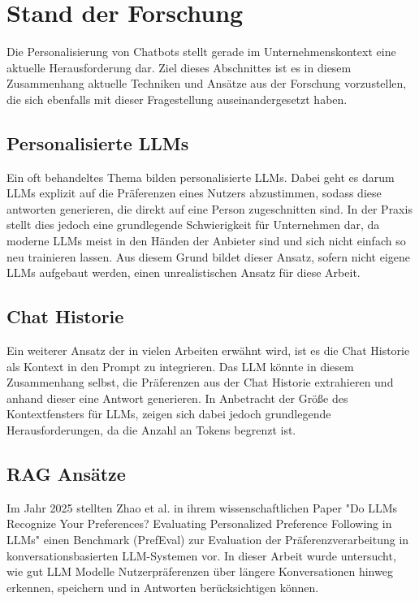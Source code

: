 \section{Stand der Forschung}
Die Personalisierung von Chatbots stellt gerade im Unternehmenskontext eine aktuelle Herausforderung dar. Ziel dieses Abschnittes ist es in diesem Zusammenhang aktuelle Techniken und Ansätze aus der Forschung vorzustellen, die sich ebenfalls mit dieser Fragestellung auseinandergesetzt haben.

\subsection{Personalisierte LLMs}
Ein oft behandeltes Thema bilden personalisierte LLMs. Dabei geht es darum LLMs explizit auf die Präferenzen eines Nutzers abzustimmen, sodass diese antworten generieren, die direkt auf eine Person zugeschnitten sind. In der Praxis stellt dies jedoch eine grundlegende Schwierigkeit für Unternehmen dar, da moderne LLMs meist in den Händen der Anbieter sind und sich nicht einfach so neu trainieren lassen. Aus diesem Grund bildet dieser Ansatz, sofern nicht eigene LLMs aufgebaut werden, einen unrealistischen Ansatz für diese Arbeit.

\subsection{Chat Historie}
Ein weiterer Ansatz der in vielen Arbeiten erwähnt wird, ist es die Chat Historie als Kontext in den Prompt zu integrieren. Das LLM könnte in diesem Zusammenhang selbst, die Präferenzen aus der Chat Historie extrahieren und anhand dieser eine Antwort generieren. In Anbetracht der Größe des Kontextfensters für LLMs, zeigen sich dabei jedoch grundlegende Herausforderungen, da die Anzahl an Tokens begrenzt ist. 

\subsection{RAG Ansätze}
Im Jahr 2025 stellten Zhao et al. in ihrem wissenschaftlichen Paper "Do LLMs Recognize Your Preferences? Evaluating Personalized Preference Following in LLMs" einen Benchmark (PrefEval) zur Evaluation der Präferenzverarbeitung in konversationsbasierten LLM-Systemen vor. In dieser Arbeit wurde untersucht, wie gut LLM Modelle Nutzerpräferenzen über längere Konversationen hinweg erkennen, speichern und in Antworten berücksichtigen können.


